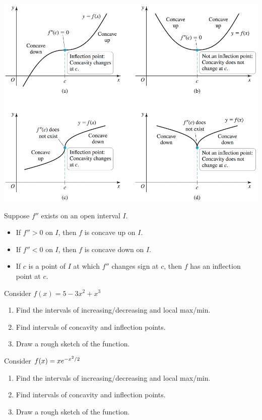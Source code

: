 \documentclass[../mathNotesPreamble]{subfiles}
\begin{document}
\begin{center}
  \includegraphics[width=0.925\linewidth]{../images/briggs_04_03/fig4_35.png}
\end{center}
\pagebreak

\begin{thmBox*}
  Suppose $f''$ exists on an open interval $I$.
  \begin{itemize}
    \item If $f''>0$ on $I$, then $f$ is concave up on $I$.
    \item If $f''<0$ on $I$, then $f$ is concave down on $I$.
    \item If $c$ is a point of $I$ at which $f''$ changes sign at $c$, then $f$ has an inflection point at $c$.
  \end{itemize}
\end{thmBox*}

\begin{ex*}
  Consider $f(x)=5-3x^2+x^3$
\end{ex*}
\begin{enumerate}[itemsep=\stretch{1}, label=\alph*)]
  \item Find the intervals of increasing/decreasing and local max/min.
  \item Find intervals of concavity and inflection points.
  \item Draw a rough sketch of the function.
\end{enumerate}
\pagebreak

\begin{ex*}
  Consider $f(x)=xe\inv[x^2/2]$
\end{ex*}
\begin{enumerate}[itemsep=\stretch{1}, label=\alph*)]
  \item Find the intervals of increasing/decreasing and local max/min.
  \item Find intervals of concavity and inflection points.
  \item Draw a rough sketch of the function.
\end{enumerate}
\pagebreak
\end{document}
